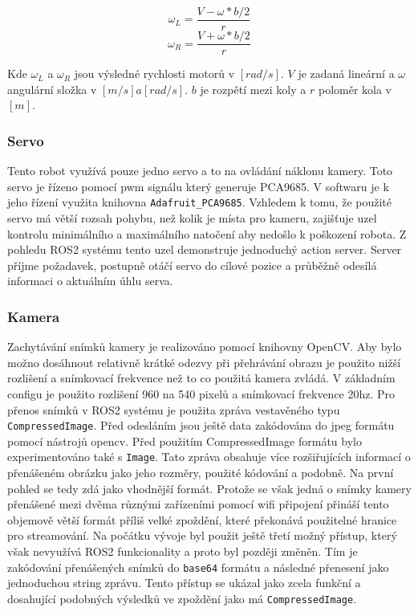 $$\omega_L = \frac{V - \omega * b/2}{r}$$
$$\omega_R = \frac{V + \omega * b/2}{r}$$

\noindent Kde $\omega_L$ a $\omega_R$ jsou výsledné rychlosti motorů v $[rad/s]$. $V$ je zadaná lineární a $\omega$ angulární složka v $[m/s] a [rad/s]$. $b$ je rozpětí mezi koly a $r$ poloměr kola v $[m]$.


\subsubsection*{Servo}
Tento robot využívá pouze jedno servo a to na ovládání náklonu kamery. Toto servo je řízeno pomocí pwm signálu který generuje PCA9685. V softwaru je k jeho řízení využita knihovna \verb|Adafruit_PCA9685|. Vzhledem k tomu, že použité servo má větší rozsah pohybu, než kolik je místa pro kameru, zajišťuje uzel kontrolu minimálního a maximálního natočení aby nedošlo k poškození robota. Z pohledu ROS2 systému tento uzel demonstruje jednoduchý action server. Server příjme požadavek, postupně otáčí servo do cílové pozice a průběžně odesílá informaci o aktuálním úhlu serva.

\subsubsection*{Kamera}
Zachytávání snímků kamery je realizováno pomocí knihovny OpenCV. Aby bylo možno dosáhnout relativně krátké odezvy při přehrávání obrazu je použito nižší rozlišení a snímkovací frekvence než to co použitá kamera zvládá. V základním configu je použito rozlišení 960 na 540 pixelů a snímkovací frekvence 20hz.
Pro přenos snímků v ROS2 systému je použita zpráva vestavěného typu \verb|CompressedImage|. Před odesláním jsou ještě data zakódována do jpeg formátu pomocí nástrojů opencv.
Před použitím CompressedImage formátu bylo experimentováno také s \verb|Image|. Tato zpráva obsahuje více rozšiřujících informací o přenášeném obrázku jako jeho rozměry, použité kódování a podobně. Na první pohled se tedy zdá jako vhodnější formát. Protože se však jedná o snímky kamery přenášené mezi dvěma různými zařízeními pomocí wifi připojení přináší tento objemově větší formát příliš velké zpoždění, které překonává použitelné hranice pro streamování. Na počátku vývoje byl použit ještě třetí možný přístup, který však nevyužívá ROS2 funkcionality a proto byl později změněn. Tím je zakódování přenášených snímků do \verb|base64| formátu a následné přenesení jako jednoduchou string zprávu. Tento přístup se ukázal jako zcela funkční a dosahující podobných výsledků ve zpoždění jako má \verb|CompressedImage|.
 
